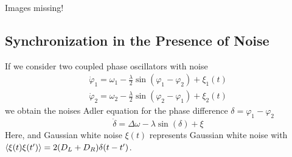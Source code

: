 \documentclass{notebook}
\begin{document}
Images missing!


\subsection*{Synchronization in the Presence of Noise}

If we consider two coupled phase oscillators with noise
%
\begin{gather}
	\dot{\varphi}_1 = \omega_1 - \frac{\lambda}{2} \sin(\varphi_1 - \varphi_2) + \xi_1(t) \\
	\dot{\varphi}_2 = \omega_2 - \frac{\lambda}{2} \sin(\varphi_2 - \varphi_1) + \xi_2(t)
\end{gather}
%
we obtain the noises Adler equation for the phase difference $\delta = \varphi_1 - \varphi_2$
%
\begin{equation}
\dot{\delta} = \Delta \omega - \lambda \sin(\delta) + \xi
\end{equation}
%
Here, and Gaussian white noise $\xi(t)$ represents Gaussian white noise with $\expval{\xi(t)\xi(t')} = 2 (D_L + D_R) \delta(t-t')$.
\end{document}
